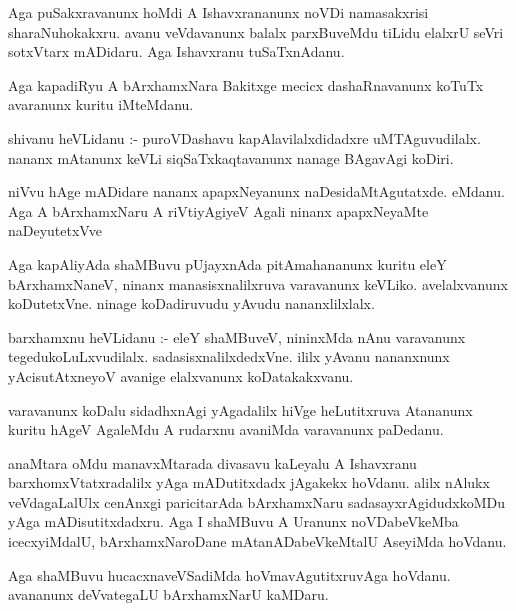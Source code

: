 \documentclass{article}
\begin{document}
\begin{mn}
Aga puSakxravanunx hoMdi A Ishavxrananunx noVDi namasakxrisi sharaNuhokakxru.  avanu veVdavanunx  
balalx parxBuveMdu  tiLidu  elalxrU  seVri sotxVtarx mADidaru.  Aga Ishavxranu tuSaTxnAdanu.
\end{mn}

\begin{mn}
Aga kapadiRyu A bArxhamxNara Bakitxge  mecicx dashaRnavanunx  koTuTx avaranunx kuritu  iMteMdanu.
\end{mn}

\begin{mn}
shivanu heVLidanu :- puroVDashavu kapAlavilalxdidadxre  uMTAguvudilalx.  nananx 
mAtanunx keVLi siqSaTxkaqtavanunx nanage BAgavAgi koDiri.
\end{mn}

\begin{mn}
niVvu hAge mADidare nananx apapxNeyanunx  naDesidaMtAgutatxde. eMdanu.  Aga 
A bArxhamxNaru A riVtiyAgiyeV Agali  ninanx apapxNeyaMte naDeyutetxVve
\end{mn}

\begin{mn}
Aga kapAliyAda shaMBuvu pUjayxnAda pitAmahananunx kuritu  eleY bArxhamxNaneV, ninanx  manasisxnalilxruva  
varavanunx keVLiko.  avelalxvanunx koDutetxVne.  ninage koDadiruvudu yAvudu nananxlilxlalx. 
\end{mn}

\begin{mn}
barxhamxnu heVLidanu :- eleY shaMBuveV, nininxMda nAnu varavanunx tegedukoLuLxvudilalx.  
sadasisxnalilxdedxVne.  ililx yAvanu nananxnunx yAcisutAtxneyoV avanige elalxvanunx koDatakakxvanu.
\end{mn}

\begin{mn}
varavanunx koDalu sidadhxnAgi yAgadalilx hiVge heLutitxruva Atananunx  kuritu hAgeV 
AgaleMdu A rudarxnu avaniMda varavanunx paDedanu.
\end{mn}

\begin{mn}
anaMtara oMdu manavxMtarada divasavu kaLeyalu A Ishavxranu  barxhomxVtatxradalilx yAga 
mADutitxdadx jAgakekx hoVdanu.  alilx nAlukx veVdagaLalUlx  cenAnxgi paricitarAda  
bArxhamxNaru sadasayxrAgidudxkoMDu yAga mADisutitxdadxru.  Aga I shaMBuvu A Uranunx 
noVDabeVkeMba  icecxyiMdalU, bArxhamxNaroDane mAtanADabeVkeMtalU  AseyiMda hoVdanu. 
\end{mn}

\begin{mn}
Aga shaMBuvu  hucacxnaveVSadiMda hoVmavAgutitxruvAga  hoVdanu.  avananunx  deVvategaLU bArxhamxNarU  kaMDaru. 
\end{mn}
\end{document}
